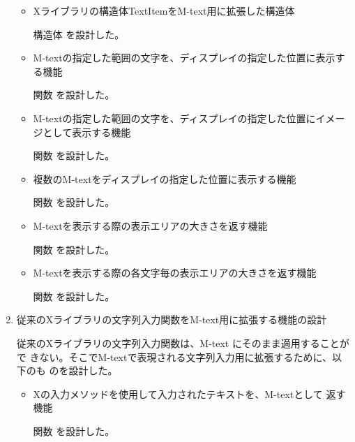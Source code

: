\begin{enumerate}
     \begin{itemize}
     \item Xライブラリの構造体TextItemをM-text用に拡張した構造体\par 
	構造体 を設計した。
      \item M-textの指定した範囲の文字を、ディスプレイの指定した位置に表示する機能\par 
	関数 を設計した。
      \item M-textの指定した範囲の文字を、ディスプレイの指定した位置にイメージとして表示する機能\par 
	関数 を設計した。
      \item 複数のM-textをディスプレイの指定した位置に表示する機能\par 
	関数 を設計した。 
      \item M-textを表示する際の表示エリアの大きさを返す機能\par 
	関数 を設計した。
      \item M-textを表示する際の各文字毎の表示エリアの大きさを返す機能\par 
	関数 を設計した。 
     \end{itemize}
     
\item 従来のXライブラリの文字列入力関数をM-text用に拡張する機能の設計

従来のXライブラリの文字列入力関数は、M-text にそのまま適用することがで
きない。そこでM-textで表現される文字列入力用に拡張するために、以下のも
のを設計した。

     \begin{itemize}
     \item Xの入力メソッドを使用して入力されたテキストを、M-textとして
 	返す機能\par 関数 を設計した。
     \end{itemize}
     
\end{enumerate}
